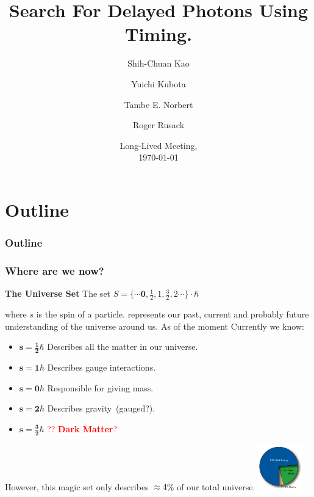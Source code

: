 \documentclass{beamer}
\title{Search For Delayed Photons Using Timing.}
\author[Tambe E. Norbert] %
{Shih-Chuan Kao\inst{1} \and Yuichi Kubota\inst{1} \and Tambe E. Norbert\inst{1} \and Roger Rusack\inst{1}}
\institute[UMN]{
\inst{1}%
University Of Minnesota
}
\date{ Long-Lived Meeting,\\ \today}
\begin{document}
\begin{frame}
\titlepage
\begin{center}
\href{mailto:norbe072@umn.edu}{}
\end{center}
\end{frame}
\section*{Outline}
\begin{frame}
\frametitle{\Huge Outline}
\tableofcontents
\end{frame}

\begin{frame}
\frametitle{\huge{Where are we now?}}
\begin{varblock}[7cm]{\textbf{The Universe Set}}
 The set  $S =\{ \cdots \mathbf{0}, \frac{1}{2}, 1,  \frac{3}{2}, 2  \cdots \} \cdot \hbar $ 
 \end{varblock}
 where $s$ is the spin of a particle. 
 represents our past, current and probably future understanding of the universe around us. As of the moment 
Currently we know:
 \begin{itemize}
  \item $\mathbf{s = \frac{1}{2}\hbar}$ Describes all the matter in our universe.
  \item $\mathbf{s = 1\hbar}$ Describes gauge interactions.
  \item $\mathbf{s = 0\hbar}$ Responsible for giving mass.
  \item $\mathbf{s = 2\hbar}$ Describes gravity~(gauged?).
  \item $\mathbf{s = \frac{3}{2}\hbar}$ \textcolor{red}{?? \textbf{Dark Matter}?}
 \end{itemize}

However, this magic set only describes $\approx 4$\% of our total universe.
\includegraphics[height=2cm,width=0.25\paperwidth]{THESISPLOTS/UniversePie30.jpg}
\end{frame}



\end{document}
